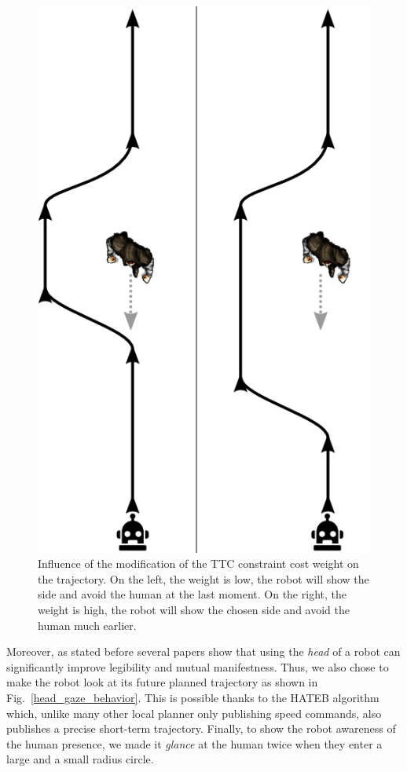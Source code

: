 \documentclass[a4paper,11pt,twoside]{StyleThese}
\begin{document}
\begin{figure}[hbtp]
\centering
\includegraphics[scale=0.4]{figures/chapter2/condition_1_proactivity_shrink.png}
\caption{Influence of the modification of the TTC constraint cost weight on the trajectory. On the left, the weight is low, the robot will show the side and avoid the human at the last moment. On the right, the weight is high, the robot will show the chosen side and avoid the human much earlier.}
\label{ttc_explanations}
\end{figure}

Moreover, as stated before  several papers show that using the \textit{head} of a robot can significantly improve legibility and mutual manifestness. Thus, we also chose to make the robot look at its future planned trajectory as shown in Fig.~\ref{head_gaze_behavior}. This is possible thanks to the HATEB algorithm which, unlike many other local planner only publishing  speed commands, also publishes a precise short-term trajectory. Finally, to show the robot awareness of the human presence, we made it \textit{glance} at the human twice when they enter a large and a small radius circle.
\end{document}
